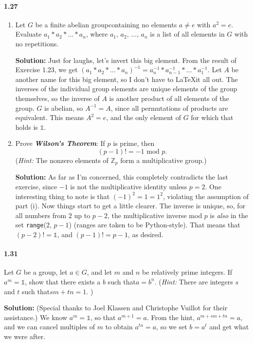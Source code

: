 \documentclass[12pt,a4paper]{article}
\providecommand{\id}{\mathbb{1}}
\providecommand{\FAG}{finite abelian group}
\providecommand{\bemph}[1]{\emph{\textbf{#1}}}
\providecommand{\hint}{\emph{Hint: }}
\providecommand{\soln}{\textbf{Solution: }}
\providecommand{\st}{such that\xspace}
\providecommand{\JK}{Joel Klassen\xspace}
\providecommand{\CV}{Christophe Vuillot\xspace}
\providecommand{\inv}{^{-1}}
\providecommand{\mod}{\textrm{ mod }}
\begin{document}
\paragraph{1.27}
\begin{enumerate}[label=(\roman*)]
\item Let $G$ be a \FAG containing no elements $a \neq e$ with $a^2 = e$. 
Evaluate $a_1 \ast a_2 \ast \ldots \ast a_n$, where $a_1,\, a_2,\, \ldots, \, a_n$ is a list of all elements in $G$ with no repetitions.

\soln Just for laughs, let's invert this big element.
From the result of Exercise 1.23, we get $(a_1 \ast a_2 \ast \ldots \ast a_n)\inv = a_n\inv \ast a_{n-1}\inv \ast \ldots \ast a_1\inv$.
Let $A$ be another name for this big element, so I don't have to \LaTeX it all out. 
The inverses of the individual group elements are unique elements of the group themselves, so the inverse of $A$ is another product of all elements of the group. 
$G$ is abelian, so $A\inv = A$, since all permutations of products are equivalent.
This means $A^2=e$, and the only element of $G$ for which that holds is $\id$.
\item Prove \bemph{Wilson's Theorem}: If $p$ is prime, then
\begin{equation*}
(p-1)! = -1 \mod p.
\end{equation*}
(\hint The nonzero elements of $\mathbb{Z}_p$ form a multiplicative group.)

\soln As far as I'm concerned, this completely contradicts the last exercise, since $-1$ is not the multiplicative identity unless $p=2$. 
One interesting thing to note is that $(-1)^2 = 1 = 1^2$, violating the assumption of part (i).
Now things start to get a little clearer. The inverse is unique, so, for all numbers from $2$ up to $p-2$, the multiplicative inverse mod $p$ is \emph{also} in the set \texttt{range}(2, $p-1$) (ranges are taken to be Python-style). 
That means that $(p-2)! = \id$, and $(p-1)! = p-1$, as desired.
\end{enumerate}

\paragraph*{1.31}
Let $G$ be a group, let $a \in G$, and let $m$ and $n$ be relatively prime integers. 
If $a^m=\id$, show that there exists a $b$ \st $a=b^n$. 
(\hint There are integers $s$ and $t$ \st $sm + tn = 1$. )

\soln (Special thanks to \JK and \CV for their assistance.) We know $a^m = \id$, so that $a^{m + 1} = a$. 
From the hint, $a^{m + sm + tn} = a$, and we can cancel multiples of $m$ to obtain $a^{tn} = a$, so we set $b = a^t$ and get what we were after.
\end{document}
